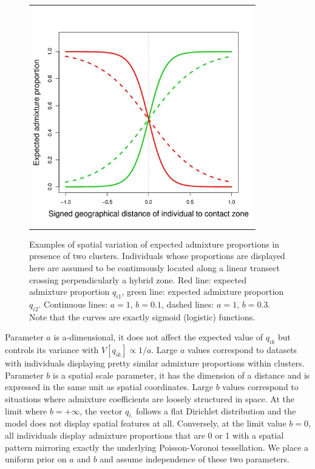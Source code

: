 \documentclass[a4paper,10pt]{article}
\begin{document}
\begin{figure}[h]
\begin{tabular}{c}
\vspace{-.1cm}\hspace{3cm} \includegraphics[width=9.5cm]{fig/exp_q_quart.jpeg} \\
\end{tabular}
\caption{Examples of spatial variation of expected admixture proportions in presence of two clusters. 
Individuals whose proportions are displayed here are assumed to be continuously located along a linear 
transect crossing perpendicularly a hybrid zone. 
 Red line: expected admixture proportion $q_{i1}$, 
green line: expected admixture proportion $q_{i2}$. 
Continuous lines: $a=1$, $b=0.1$, dashed lines: $a=1$, $b=0.3$.
Note that the curves are exactly sigmoid (logistic) functions. }\label{fig:exp_q}
\end{figure}

Parameter $a$ is a-dimensional, it does not affect the expected value of  $q_{ik}$ but 
controls its variance  with $V[q_{ik}] \propto 1/a$. 
Large $a$ values correspond to datasets with individuals displaying pretty similar admixture 
proportions within clusters.
Parameter $b$ is a spatial scale parameter, it has the dimension of a distance and is expressed in 
the same unit as spatial coordinates. 
Large $b$ values correspond to situations where admixture coefficients are loosely structured in space. 
At the limit where  $b= +\infty$, 
the vector $q_{i.}$ follows a flat Dirichlet distribution and the model does not display spatial features at all. 
Conversely, at the limit value $b=0$, all individuals display  admixture proportions that are 0 or 1 
with a spatial pattern mirroring exactly 
the underlying Poisson-Voronoi tessellation.
We place a uniform prior on $a$ and $b$ and assume independence of these two parameters.
\end{document}
